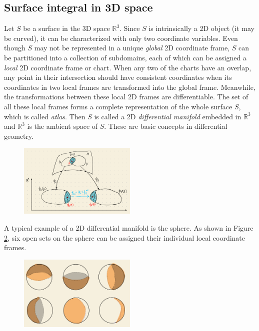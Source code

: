 \documentclass[11pt, a4paper]{article}
\begin{document}
\subsection{Surface integral in 3D space}

Let $S$ be a surface in the 3D space $\mathbb{R}^3$. Since $S$ is intrinsically a 2D
object (it may be curved), it can be characterized with only two coordinate variables.
Even though $S$ may not be represented in a unique \emph{global} 2D coordinate frame, $S$
can be partitioned into a collection of subdomains, each of which can be assigned a
\emph{local} 2D coordinate frame or chart. When any two of the charts have an overlap, any
point in their intersection should have consistent coordinates when its coordinates in two
local frames are transformed into the global frame. Meanwhile, the transformations between
these local 2D frames are differentiable. The set of all these local frames forms a
complete representation of the whole surface $S$, which is called \emph{atlas}. Then $S$
is called a 2D \emph{differential manifold} embedded in $\mathbb{R}^3$ and $\mathbb{R}^3$
is the ambient space of $S$. These are basic concepts in differential geometry.
\begin{figure}[htbp]
  \centering
  \includegraphics[width=0.5\textwidth, height=\textheight, keepaspectratio]{figures/manifold-draft}
  \caption{}
  \label{fig:differential-manifold}
\end{figure}
A typical example of a 2D differential manifold is the sphere. As shown in Figure
\ref{fig:sphere-manifold}, six open sets on the sphere can be assigned their individual
local coordinate frames.
\begin{figure}[htbp]
  \centering
  \includegraphics[width=0.5\textwidth, height=\textheight, keepaspectratio]{figures/coordinate-chart-for-sphere-draft}
  \caption{}
  \label{fig:sphere-manifold}
\end{figure}
\end{document}

